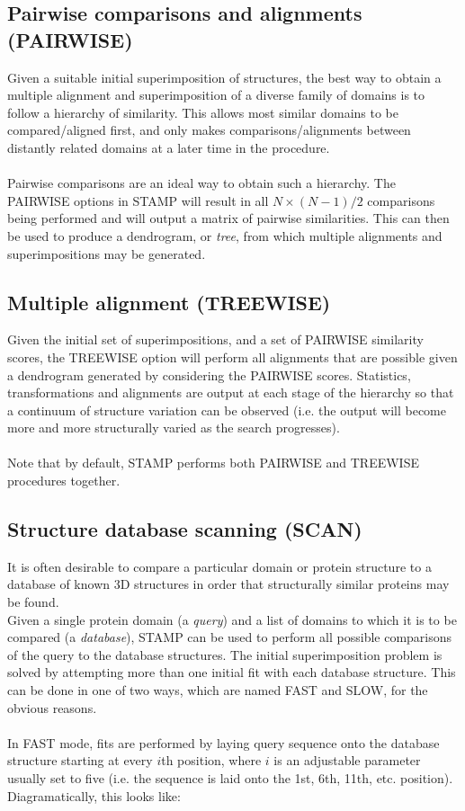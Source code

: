 \subsection{Pairwise comparisons and alignments (PAIRWISE)}

Given a suitable initial superimposition of structures, 
the best way to obtain a multiple alignment and 
superimposition of a diverse family of domains is to follow a 
hierarchy of similarity.  This allows most similar domains to be 
compared/aligned first, and only makes comparisons/alignments
between distantly related domains at a later time in the procedure.\\
\\
Pairwise comparisons are an ideal way to obtain such a hierarchy. 
The PAIRWISE options in STAMP will result in all $N \times (N-1)/2$
comparisons being performed and will output a matrix of pairwise
similarities.  This can then be used to produce a
dendrogram, or {\em tree}, from which multiple alignments and
superimpositions may be generated.

\subsection{Multiple alignment (TREEWISE)}


Given the initial set of superimpositions, and a set of
PAIRWISE similarity scores, the TREEWISE option will
perform all alignments that are possible given a dendrogram generated 
by considering the PAIRWISE scores. 
Statistics, transformations and alignments are output at each stage
of the hierarchy so that a continuum of structure variation can be
observed (i.e. the output will become more and more structurally varied
as the search progresses).\\
\\
Note that by default, STAMP performs both PAIRWISE and TREEWISE procedures together.

\subsection{Structure database scanning (SCAN)}

It is often desirable to compare a particular domain or protein 
structure to a database of known 3D structures in order that structurally similar 
proteins may be found.
\\
Given a single protein domain (a {\em query}) and a list of domains to which it is
to be compared (a {\em database}), STAMP can be used to perform all possible
comparisons of the query to the database structures.  The initial
superimposition problem is solved by attempting more than one
initial fit with each database structure.    This can be done in one of two ways,
which are named FAST and SLOW, for the obvious reasons.\\
\\
In FAST mode, fits are performed by laying
query sequence onto the database structure starting at every $i$th position,
where $i$ is an adjustable parameter usually set to five (i.e. the sequence
is laid onto the 1st, 6th, 11th, etc. position).   Diagramatically, this looks
like:\\

